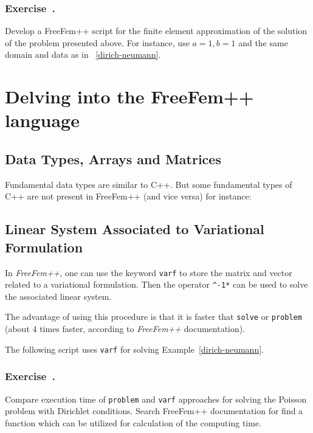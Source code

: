 \documentclass[12pt]{article}
\newcommand{\FF}{\textit{FreeFem++}\xspace}
\newcounter{exercise}
\newenvironment{exercise}{%
  \stepcounter{exercise}
  \subsubsection*{Exercise~\theexercise.}}
{}
\begin{document}
\begin{exercise}
  Develop a FreeFem++ script for the finite element approximation of
  the solution of the problem presented above. For instance, use
  $a=1, b=1$ and the same domain and data as in
  \lstlistingname~\ref{dirich-neumann}.
\end{exercise}

\section{Delving into the FreeFem++ language}
\label{sec:delv-into-freef}

\subsection{Data Types, Arrays and Matrices}
\label{sec:data-types-arrays}

Fundamental data types are similar to C++. But some fundamental types of C++ are not present in FreeFem++ (and vice versa) for instance:


\subsection{Linear System Associated to Variational Formulation}
\label{part:line-syst-assoc}

In \FF, one can use the keyword \texttt{varf} to store the matrix and
vector related to a variational formulation. Then the operator \verb|^-1*|
can be used to solve the associated linear system.

The advantage of using this procedure is that it is faster that
\texttt{solve} or \texttt{problem} (about 4 times faster, according to
\FF documentation).

The following script uses \texttt{varf} for solving Example~\ref{dirich-neumann}.



\begin{exercise}
  Compare execution time of \texttt{problem} and \texttt{varf}
  approaches for solving the Poisson problem with Dirichlet
  conditions.  Search FreeFem++ documentation for find a function
  which can be utilized for calculation of the computing time.
\end{exercise}
\end{document}
